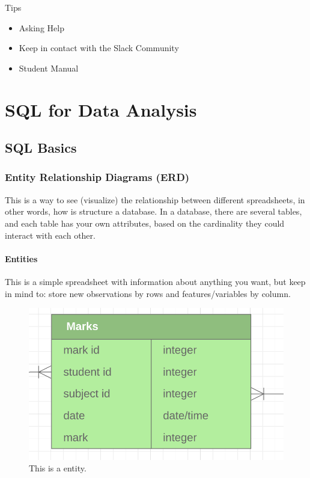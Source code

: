 \documentclass[]{book}
\providecommand{\tightlist}{%
  \setlength{\itemsep}{0pt}\setlength{\parskip}{0pt}}
\begin{document}
Tips

\begin{itemize}
\tightlist
\item
  Asking Help
\item
  Keep in contact with the Slack Community
\item
  Student Manual
\end{itemize}

\chapter{SQL for Data Analysis}\label{sql-for-data-analysis}

\section{SQL Basics}\label{sql-basics}

\subsection{Entity Relationship Diagrams
(ERD)}\label{entity-relationship-diagrams-erd}

This is a way to see (visualize) the relationship between different
spreadsheets, in other words, how is structure a database. In a
database, there are several tables, and each table has your own
attributes, based on the cardinality they could interact with each
other.

\subsubsection{Entities}\label{entities}

This is a simple spreadsheet with information about anything you want,
but keep in mind to: store new observations by rows and
features/variables by column.

\begin{figure}
\centering
\includegraphics{01-img/1.png}
\caption{This is a entity.}
\end{figure}
\end{document}
